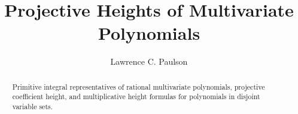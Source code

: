 \documentclass[11pt,a4paper]{article}
\begin{document}
\title{Projective Heights of Multivariate Polynomials}
\author{Lawrence C. Paulson}
\maketitle
\begin{abstract}
Primitive integral representatives of rational multivariate polynomials,
projective coefficient height, and multiplicative height formulas for
polynomials in disjoint variable sets.
\end{abstract}

\end{document}
